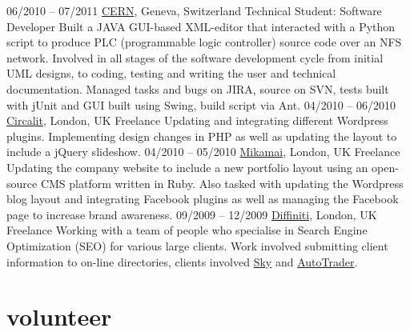 \documentclass[]{friggeri-cv}
\begin{document}
\begin{entrylist}
  \entry
    {06/2010 – 07/2011}
    {\href{http://cern.ch}{CERN}, Geneva, Switzerland}
    {Technical Student: Software Developer}
    {Built a JAVA GUI-based XML-editor that interacted with a Python script to produce PLC (programmable logic controller) source code over an NFS network. Involved in all stages of the software development cycle from initial UML designs, to coding, testing and writing the user and technical documentation. Managed tasks and bugs on JIRA, source on SVN, tests built with jUnit and GUI built using Swing, build script via Ant.}
  \entry
    {04/2010 – 06/2010}
    {\href{http://www.circalit.com}{Circalit}, London, UK}
    {Freelance}
    {Updating and integrating different Wordpress plugins. Implementing design changes in PHP as well as updating the layout to include a jQuery slideshow.}
  \entry
    {04/2010 – 05/2010}
    {\href{http://mikamai.com}{Mikamai}, London, UK}
    {Freelance}
    {Updating the company website to include a new portfolio layout using an open-source CMS platform written in Ruby. Also tasked with updating the Wordpress blog layout and integrating Facebook plugins as well as managing the Facebook page to increase brand awareness.}
  \entry
    {09/2009 – 12/2009}
    {\href{http://www.diffiniti.com}{Diffiniti}, London, UK}
    {Freelance}
    {Working with a team of people who specialise in Search Engine Optimization (SEO) for various large clients. Work involved submitting client information to on-line directories, clients involved \href{http://www.sky.com}{Sky} and \href{http://www.autotrader.com}{AutoTrader}.}
\end{entrylist}

\section{volunteer}
\end{document}
